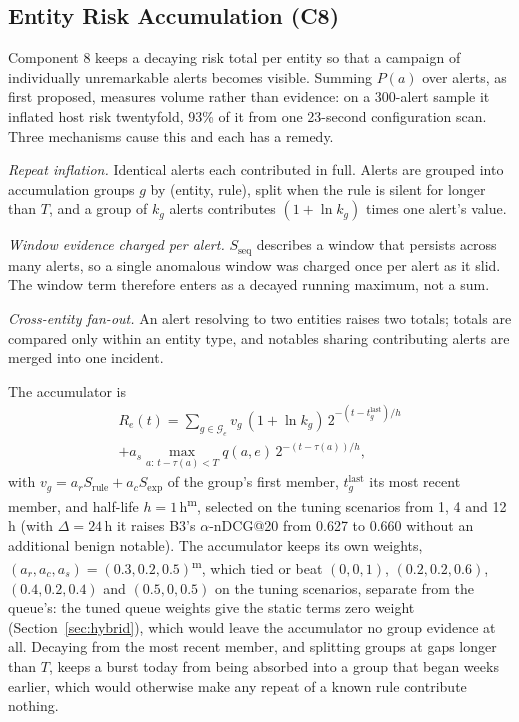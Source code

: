 \documentclass[conference]{IEEEtran}
\newcommand{\meas}{\textsuperscript{\textcolor{green!45!black}{m}}}    %
\begin{document}
\subsection{Entity Risk Accumulation (C8)}
\label{sec:accum}

Component 8 keeps a decaying risk total per entity so that a campaign of individually unremarkable alerts becomes visible. Summing $P(a)$ over alerts, as first proposed, measures volume rather than evidence: on a 300-alert sample it inflated host risk twentyfold, 93\% of it from one 23-second configuration scan. Three mechanisms cause this and each has a remedy.

\textit{Repeat inflation.} Identical alerts each contributed in full. Alerts are grouped into accumulation groups $g$ by (entity, rule), split when the rule is silent for longer than $T$, and a group of $k_g$ alerts contributes $(1 + \ln k_g)$ times one alert's value.

\textit{Window evidence charged per alert.} $S_\mathrm{seq}$ describes a window that persists across many alerts, so a single anomalous window was charged once per alert as it slid. The window term therefore enters as a decayed running maximum, not a sum.

\textit{Cross-entity fan-out.} An alert resolving to two entities raises two totals; totals are compared only within an entity type, and notables sharing contributing alerts are merged into one incident.

The accumulator is
\begin{multline}
R_e(t) = \sum_{g \in \mathcal{G}_e} v_g\,(1 + \ln k_g)\, 2^{-(t - t^{\mathrm{last}}_g)/h} \\
+ a_s \max_{a :\, t - \tau(a) < T} q(a, e)\, 2^{-(t - \tau(a))/h},
\end{multline}
with $v_g = a_r S_\mathrm{rule} + a_c S_\mathrm{exp}$ of the group's first member, $t^{\mathrm{last}}_g$ its most recent member, and half-life $h = 1$\,h\meas{}, selected on the tuning scenarios from 1, 4 and 12\,h (with $\Delta = 24$\,h it raises B3's $\alpha$-nDCG@20 from 0.627 to 0.660 without an additional benign notable). The accumulator keeps its own weights, $(a_r, a_c, a_s) = (0.3, 0.2, 0.5)$\meas{}, which tied or beat $(0, 0, 1)$, $(0.2, 0.2, 0.6)$, $(0.4, 0.2, 0.4)$ and $(0.5, 0, 0.5)$ on the tuning scenarios, separate from the queue's: the tuned queue weights give the static terms zero weight (Section~\ref{sec:hybrid}), which would leave the accumulator no group evidence at all. Decaying from the most recent member, and splitting groups at gaps longer than $T$, keeps a burst today from being absorbed into a group that began weeks earlier, which would otherwise make any repeat of a known rule contribute nothing.
\end{document}
